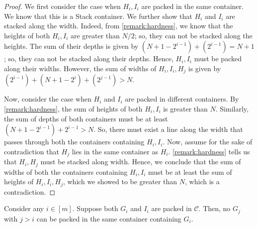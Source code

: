 \begin{proof}
    We first consider the case when $H_i,I_i$ are packed in the same container.
    We know that this is a Stack container. We further show that $H_i$ and $I_i$ are stacked along the width.
    Indeed, from \cref{remark:hardness}, we know that the heights of both $H_i,I_i$ are greater than $N/2$; so, they can not be stacked along the heights. The sum of their depths is given by $(N+1-2^{i-1})+(2^{i-1})=N+1$; so, they can not be stacked along their depths. Hence, $H_i,I_i$ must be packed along their widths. However, the sum of widths of $H_i,I_i,H_j$ is given by $(2^{i-1})+(N+1-2^{i})+(2^{j-1})>N$.

    Now, consider the case when $H_i$ and $I_i$ are packed in different containers.
    By \cref{remark:hardness}, the sum of heights of both $H_i,I_i$ is greater than $N$. Similarly, the sum of depths of both containers must be at least $(N+1-2^{i-1})+2^{i-1}>N$.
    So, there must exist a line along the width that passes through both the containers containing $H_i,I_i$.
    Now, assume for the sake of contradiction that $H_j$ lies in the same container as $H_i$. \cref{remark:hardness} tells us that $H_i,H_j$ must be stacked along width.
    Hence, we conclude that the sum of widths of both the containers containing $H_i,I_i$ must be at least the sum of heights of $H_i,I_i,H_j$, which we showed to be greater than $N$,
    which is a contradiction.
\end{proof}
\begin{claim}
\label{lem:gig}
    Consider any $i\in[m]$. Suppose both $G_i$ and $I_i$ are packed in $\mathcal C$. Then, no $G_j$ with $j>i$ can be packed in the same container containing $G_i$.
\end{claim}
